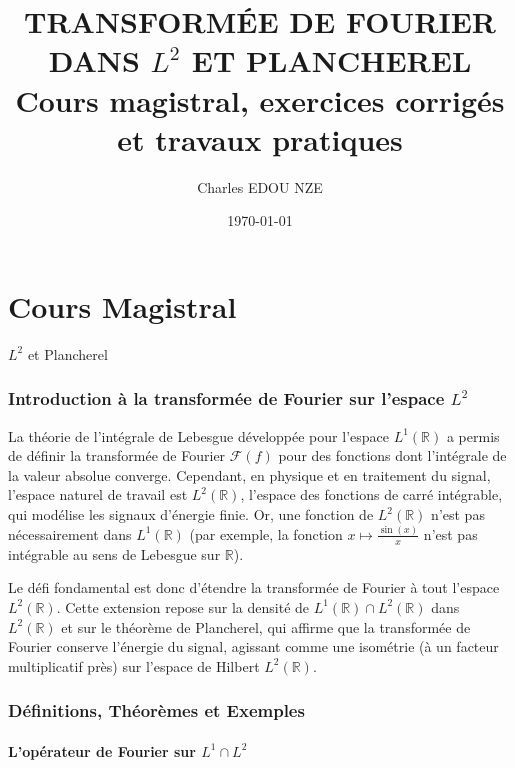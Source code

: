 \documentclass[11pt,a4paper]{article}
\title{\Huge TRANSFORMÉE DE FOURIER DANS $L^2$ ET PLANCHEREL \\ \large Cours magistral, exercices corrigés et travaux pratiques}
\author{\Large Charles EDOU NZE}
\date{\today}
\begin{document}
\maketitle
\tableofcontents
\newpage

\part{Cours Magistral}
$L^2$ et Plancherel

\section{Introduction à la transformée de Fourier sur l'espace $L^2$}

La théorie de l'intégrale de Lebesgue développée pour l'espace $L^1(\mathbb{R})$ a permis de définir la transformée de Fourier $\mathcal{F}(f)$ pour des fonctions dont l'intégrale de la valeur absolue converge. Cependant, en physique et en traitement du signal, l'espace naturel de travail est $L^2(\mathbb{R})$, l'espace des fonctions de carré intégrable, qui modélise les signaux d'énergie finie. Or, une fonction de $L^2(\mathbb{R})$ n'est pas nécessairement dans $L^1(\mathbb{R})$ (par exemple, la fonction $x \mapsto \frac{\sin(x)}{x}$ n'est pas intégrable au sens de Lebesgue sur $\mathbb{R}$).

Le défi fondamental est donc d'étendre la transformée de Fourier à tout l'espace $L^2(\mathbb{R})$. Cette extension repose sur la densité de $L^1(\mathbb{R}) \cap L^2(\mathbb{R})$ dans $L^2(\mathbb{R})$ et sur le théorème de Plancherel, qui affirme que la transformée de Fourier conserve l'énergie du signal, agissant comme une isométrie (à un facteur multiplicatif près) sur l'espace de Hilbert $L^2(\mathbb{R})$.

\section{Définitions, Théorèmes et Exemples}

\subsection{L'opérateur de Fourier sur $L^1 \cap L^2$}

\end{document}
